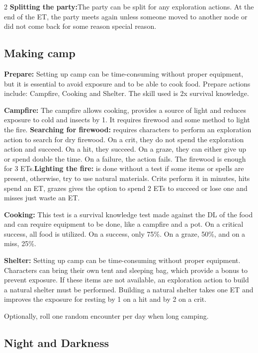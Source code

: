 \begin{multicols}{2}
{\textbf{Splitting the party:}The party can be split for any exploration actions. At the end of the ET, the party meets again unless someone moved to another node or did not come back for some reason special reason.
}

\subsection{Making camp}

\textbf{Prepare:} Setting up camp can be time-consuming without proper equipment, but it is essential to avoid exposure and to be able to cook food. Prepare actions include: Campfire, Cooking and Shelter. The skill used is 2x survival knowledge.

\textbf{Campfire:} The campfire allows cooking, provides a source of light and reduces exposure to cold and insects by 1. It requires firewood and some method to light the fire. \textbf{Searching for firewood:} requires characters to perform an exploration action to search for dry firewood. On a crit, they do not spend the exploration action and succeed. On a hit, they succeed. On a graze, they can either give up or spend double the time. On a failure, the action fails. The firewood is enough for 3 ETs.\textbf{Lighting the fire:} is done without a test if some items or spells are present, otherwise, try to use natural materials. Crits perform it in minutes, hits spend an ET, grazes gives the option to spend 2 ETs to succeed or lose one and misses just waste an ET.

\textbf{Cooking:} This test is a survival knowledge test made against the DL of the food and can require equipment to be done, like a campfire and a pot. On a critical success, all food is utilized. On a success, only 75\%. On a graze, 50\%, and on a miss, 25\%.

\textbf{Shelter:} Setting up camp can be time-consuming without proper equipment. Characters can bring their own tent and sleeping bag, which provide a bonus to prevent exposure. If these items are not available, an exploration action to build a natural shelter must be performed. Building a natural shelter takes one ET and improves the exposure for resting by 1 on a hit and by 2 on a crit.

Optionally, roll one random encounter per day when long camping. 

\subsection{Night and Darkness}


\end{multicols}
